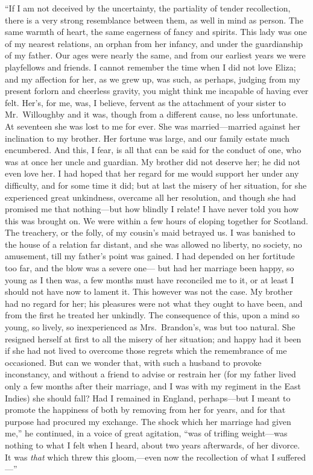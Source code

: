 \documentclass{article}
\begin{document}
``If I am not deceived by the uncertainty, the partiality
of tender recollection, there is a very strong resemblance
between them, as well in mind as person.  The same warmth
of heart, the same eagerness of fancy and spirits.
This lady was one of my nearest relations, an orphan from
her infancy, and under the guardianship of my father.
Our ages were nearly the same, and from our earliest years
we were playfellows and friends.  I cannot remember the
time when I did not love Eliza; and my affection for her,
as we grew up, was such, as perhaps, judging from my
present forlorn and cheerless gravity, you might think me
incapable of having ever felt.  Her's, for me, was, I believe,
fervent as the attachment of your sister to Mr.\ Willoughby
and it was, though from a different cause, no less unfortunate.
At seventeen she was lost to me for ever.  She was
married---married against her inclination to my brother.
Her fortune was large, and our family estate much encumbered.
And this, I fear, is all that can be said for the
conduct of one, who was at once her uncle and guardian.
My brother did not deserve her; he did not even love her.
I had hoped that her regard for me would support her
under any difficulty, and for some time it did; but at
last the misery of her situation, for she experienced
great unkindness, overcame all her resolution, and though
she had promised me that nothing---but how blindly I
relate!  I have never told you how this was brought on.
We were within a few hours of eloping together for Scotland.
The treachery, or the folly, of my cousin's maid betrayed us.
I was banished to the house of a relation far distant,
and she was allowed no liberty, no society, no amusement,
till my father's point was gained.  I had depended on her
fortitude too far, and the blow was a severe one---%
but had her marriage been happy, so young as I then was,
a few months must have reconciled me to it, or at least
I should not have now to lament it.  This however
was not the case.  My brother had no regard for her;
his pleasures were not what they ought to have been,
and from the first he treated her unkindly.  The consequence
of this, upon a mind so young, so lively, so inexperienced
as Mrs.\ Brandon's, was but too natural.  She resigned
herself at first to all the misery of her situation;
and happy had it been if she had not lived to overcome those
regrets which the remembrance of me occasioned.  But can we
wonder that, with such a husband to provoke inconstancy,
and without a friend to advise or restrain her (for
my father lived only a few months after their marriage,
and I was with my regiment in the East Indies) she
should fall?  Had I remained in England, perhaps---but I
meant to promote the happiness of both by removing
from her for years, and for that purpose had procured
my exchange.  The shock which her marriage had given me,''
he continued, in a voice of great agitation, ``was of
trifling weight---was nothing to what I felt when I heard,
about two years afterwards, of her divorce.  It was
\emph{that} which threw this gloom,---even now the recollection
of what I suffered---''
\end{document}
